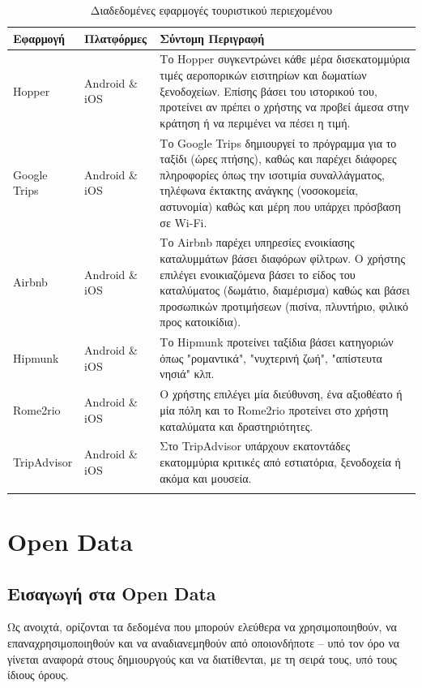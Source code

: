 \documentclass[oneside, 12pt]{book}
\begin{document}
\begin{longtable}{|p{}|p{}|p{}|}
\hline
Εφαρμογή & Πλατφόρμες & Σύντομη Περιγραφή\\
\hline
Hopper & Android \& iOS & Το Hopper συγκεντρώνει κάθε μέρα 
δισεκατομμύρια τιμές αεροπορικών εισιτηρίων και δωματίων ξενοδοχείων. 
Επίσης βάσει του ιστορικού του, προτείνει αν πρέπει ο χρήστης να 
προβεί άμεσα στην κράτηση ή να περιμένει να πέσει η τιμή. \\
\hline
Google Trips & Android \& iOS & Το Google Trips δημιουργεί το 
πρόγραμμα για το ταξίδι (ώρες πτήσης), καθώς και παρέχει διάφορες 
πληροφορίες όπως την ισοτιμία συναλλάγματος, τηλέφωνα έκτακτης ανάγκης 
(νοσοκομεία, αστυνομία) καθώς και μέρη που υπάρχει πρόσβαση σε Wi-Fi.\\
\hline
Airbnb & Android \& iOS & Το Airbnb παρέχει υπηρεσίες ενοικίασης 
καταλυμμάτων βάσει διαφόρων φίλτρων. Ο χρήστης επιλέγει ενοικιαζόμενα βάσει το είδος του καταλύματος (δωμάτιο, διαμέρισμα) καθώς και βάσει προσωπικών προτιμήσεων (πισίνα, πλυντήριο, φιλικό προς κατοικίδια).\\ 
\hline
Hipmunk & Android \& iOS & Το Hipmunk προτείνει ταξίδια βάσει
κατηγοριών όπως "ρομαντικά", "νυχτερινή ζωή", "απίστευτα νησιά" κλπ.\\
\hline
Rome2rio & Android \& iOS & Ο χρήστης επιλέγει μία διεύθυνση, ένα 
αξιοθέατο ή μία πόλη και το Rome2rio προτείνει στο χρήστη καταλύματα 
και δραστηριότητες.\\
\hline
TripAdvisor & Android \& iOS & Στο TripAdvisor υπάρχουν εκατοντάδες 
εκατομμύρια κριτικές από εστιατόρια, ξενοδοχεία ή ακόμα και μουσεία.\\
\hline
\caption{Διαδεδομένες εφαρμογές τουριστικού περιεχομένου}
\label{table:famous_tourist_relevant_apps}
\end{longtable}
\cite{Oprahmag_TravelApps}

\chapter{Open Data}
\section{Εισαγωγή στα Open Data}
Ως ανοιχτά, ορίζονται τα δεδομένα που μπορούν ελεύθερα να 
χρησιμοποιηθούν, να επαναχρησιμοποιηθούν και να αναδιανεμηθούν από 
οποιονδήποτε – υπό τον όρο να γίνεται αναφορά στους δημιουργούς και να διατίθενται, με τη σειρά τους, υπό τους ίδιους όρους.
\end{document}
